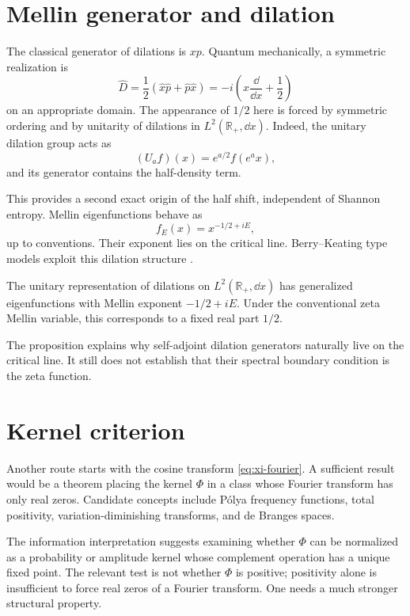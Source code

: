 \section{Mellin generator and dilation}
The classical generator of dilations is $xp$. Quantum mechanically, a symmetric realization is
\begin{equation}
\widehat D=\frac12(\widehat x\widehat p+\widehat p\widehat x)
=-i\left(x\frac{\dd}{\dd x}+\frac12\right)
\end{equation}
on an appropriate domain. The appearance of $1/2$ here is forced by symmetric ordering and by unitarity of dilations in $L^2(\mathbb R_+,\dd x)$. Indeed, the unitary dilation group acts as
\begin{equation}
(U_a f)(x)=e^{a/2}f(e^a x),
\end{equation}
and its generator contains the half-density term.

This provides a second exact origin of the half shift, independent of Shannon entropy. Mellin eigenfunctions behave as
\begin{equation}
f_E(x)=x^{-1/2+iE},
\end{equation}
up to conventions. Their exponent lies on the critical line. Berry--Keating type models exploit this dilation structure \cite{BerryKeating1999,Sierra2007}.

\begin{proposition}
The unitary representation of dilations on $L^2(\mathbb R_+,\dd x)$ has generalized eigenfunctions with Mellin exponent $-1/2+iE$. Under the conventional zeta Mellin variable, this corresponds to a fixed real part $1/2$.
\end{proposition}

The proposition explains why self-adjoint dilation generators naturally live on the critical line. It still does not establish that their spectral boundary condition is the zeta function.

\section{Kernel criterion}
Another route starts with the cosine transform \eqref{eq:xi-fourier}. A sufficient result would be a theorem placing the kernel $\Phi$ in a class whose Fourier transform has only real zeros. Candidate concepts include Pólya frequency functions, total positivity, variation-diminishing transforms, and de Branges spaces.

The information interpretation suggests examining whether $\Phi$ can be normalized as a probability or amplitude kernel whose complement operation has a unique fixed point. The relevant test is not whether $\Phi$ is positive; positivity alone is insufficient to force real zeros of a Fourier transform. One needs a much stronger structural property.


